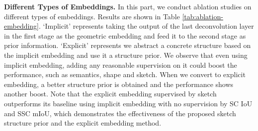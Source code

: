 \documentclass[10pt,twocolumn,letterpaper]{article}
\begin{document}
\begin{table}[t]
\begin{center}
\vspace{-0.35cm}
\end{center}
\caption{\textbf{Ablation studies on different types of embeddings}. We perform this ablation study on NYUCAD dataset.}
\label{tab:ablation-embedding}
\end{table} \noindent \textbf{Different Types of Embeddings.} In this part, we conduct ablation studies on different types of embeddings. Results are shown in Table \ref{tab:ablation-embedding}. `Implicit' represents taking the output of the last deconvolution layer in the first stage as the geometric embedding and feed it to the second stage as prior information. `Explicit' represents we abstract a concrete structure based on the implicit embedding and use it a structure prior. We observe that even using implicit embedding, adding any reasonable supervision on it could boost the performance, such as semantics, shape and sketch. When we convert to explicit embedding, a better structure prior is obtained and the performance shows another boost. Note that the explicit embedding supervised by sketch outperforms its baseline using implicit embedding with no supervision by  SC IoU and  SSC mIoU, which demonstrates the effectiveness of the proposed sketch structure prior and the explicit embedding method.
\end{document}
